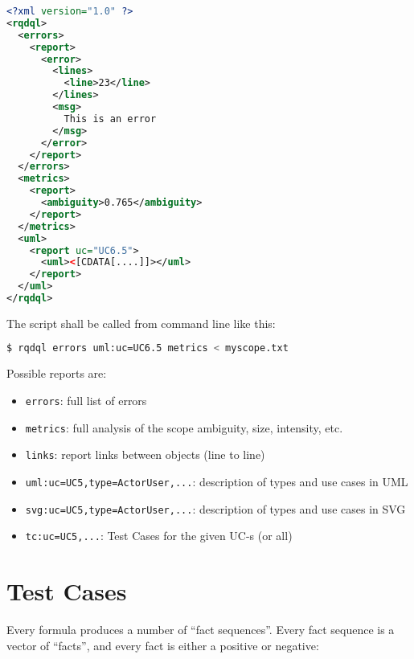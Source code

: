 \documentclass{article}
\begin{document}
    \begin{lstlisting}[language=XML]
<?xml version="1.0" ?>
<rqdql>
  <errors>
    <report>
      <error>
        <lines>
          <line>23</line>
        </lines>
        <msg>
          This is an error
        </msg>
      </error>
    </report>
  </errors>
  <metrics>
    <report>
      <ambiguity>0.765</ambiguity>
    </report>
  </metrics>
  <uml>
    <report uc="UC6.5">
      <uml><[CDATA[....]]></uml>
    </report>
  </uml>
</rqdql>
    \end{lstlisting}

    The script shall be called from command line like this:
    
    \begin{lstlisting}[language=bash]
$ rqdql errors uml:uc=UC6.5 metrics < myscope.txt
    \end{lstlisting}
    
    Possible reports are:
    
    \begin{itemize}
        \item \texttt{errors}: full list of errors
        \item \texttt{metrics}: full analysis of the scope ambiguity, size, intensity, etc.
        \item \texttt{links}: report links between objects (line to line)
        \item \texttt{uml:uc=UC5,type=ActorUser,...}: description of types and use cases in UML
        \item \texttt{svg:uc=UC5,type=ActorUser,...}: description of types and use cases in SVG
        \item \texttt{tc:uc=UC5,...}: Test Cases for the given UC-s (or all)
    \end{itemize}
    
\newpage
\section{Test Cases}

    Every formula produces a number of ``fact sequences''. Every fact sequence
    is a vector of ``facts'', and every fact is either a positive or negative:
    
\end{document}
